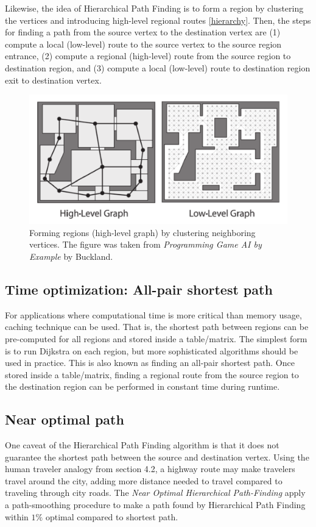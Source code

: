 \documentclass{article}
\begin{document}
Likewise, the idea of Hierarchical Path Finding is to form a region by clustering the vertices and introducing high-level regional routes \autoref{hierarchy}. Then, the steps for finding a path from the source vertex to the destination vertex are (1) compute a local (low-level) route to the source vertex to the source region entrance, (2) compute a regional (high-level) route from the source region to destination region, and (3) compute a local (low-level) route to destination region exit to destination vertex.

\begin{figure} 
\centering
\includegraphics[scale=0.4]{hierarchy.png}
\caption{Forming regions (high-level graph) by clustering neighboring vertices. The figure was taken from \textit{Programming Game AI by Example} by Buckland\cite{Buckland}.} 
\label{hierarchy}
\end{figure}


\subsection{Time optimization: All-pair shortest path}
For applications where computational time is more critical than memory usage, caching technique can be used\cite{Buckland}. That is, the shortest path between regions can be pre-computed for all regions and stored inside a table/matrix. The simplest form is to run Dijkstra on each region, but more sophisticated algorithms should be used in practice. This is also known as finding an all-pair shortest path. Once stored inside a table/matrix, finding a regional route from the source region to the destination region can be performed in constant time during runtime. 


\subsection{Near optimal path}
One caveat of the Hierarchical Path Finding algorithm is that it does not guarantee the shortest path between the source and destination vertex. Using the human traveler analogy from section 4.2, a highway route may make travelers travel around the city, adding more distance needed to travel compared to traveling through city roads\cite{Botea2004NearOH}. The \textit{Near Optimal Hierarchical Path-Finding} apply a path-smoothing procedure to make a path found by Hierarchical Path Finding within $1\%$ optimal compared to shortest path\cite{Botea2004NearOH}.
\end{document}
